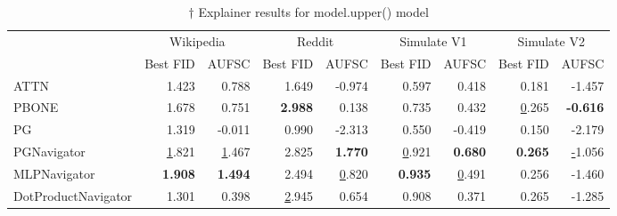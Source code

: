 \begin{table}
\caption{$\dagger$ Explainer results for {model.upper()} model}
\label{tab:tgn_results}
\begin{tabular}{lrrrrrrrr}
\toprule
 & \multicolumn{2}{c}{Wikipedia} & \multicolumn{2}{c}{Reddit} & \multicolumn{2}{c}{Simulate V1} & \multicolumn{2}{c}{Simulate V2} \\
 & Best FID & AUFSC & Best FID & AUFSC & Best FID & AUFSC & Best FID & AUFSC \\
\midrule
ATTN & 1.423 & 0.788 & 1.649 & -0.974 & 0.597 & 0.418 & 0.181 & -1.457 \\
PBONE & 1.678 & 0.751 & \bfseries 2.988 & 0.138 & 0.735 & 0.432 & \underline 0.265 & \bfseries -0.616 \\
PG & 1.319 & -0.011 & 0.990 & -2.313 & 0.550 & -0.419 & 0.150 & -2.179 \\
PGNavigator & \underline 1.821 & \underline 1.467 & 2.825 & \bfseries 1.770 & \underline 0.921 & \bfseries 0.680 & \bfseries 0.265 & \underline -1.056 \\
MLPNavigator & \bfseries 1.908 & \bfseries 1.494 & 2.494 & \underline 0.820 & \bfseries 0.935 & \underline 0.491 & 0.256 & -1.460 \\
DotProductNavigator & 1.301 & 0.398 & \underline 2.945 & 0.654 & 0.908 & 0.371 & 0.265 & -1.285 \\
\bottomrule
\end{tabular}
\end{table}
